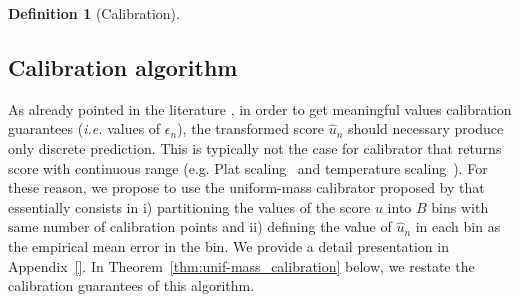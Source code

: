 \documentclass{article}
\theoremstyle{plain}
\theoremstyle{definition}
\newtheorem{definition}[theorem]{Definition}
\theoremstyle{remark}
\begin{document}
\begin{definition}[Calibration]
\end{definition}

\subsection{Calibration algorithm}
\label{sec:calib_algo}

As already pointed in the literature \cite{gupta2022distributionfreebinaryclassificationprediction}, in order to get meaningful values calibration guarantees (\textit{i.e.} values of $\epsilon_n$), the transformed score $\widehat{u}_n$ should necessary produce only discrete prediction. This is typically not the case for calibrator that returns score with continuous range (e.g. Plat scaling~\cite{plat_scaling} and temperature scaling~\cite{guo2017calibrationmodernneuralnetworks}). For these reason, we propose to use the uniform-mass calibrator proposed by \citep{gupta_distribution-free_2021} that essentially consists in i) partitioning the values of the score $u$ into $B$ bins with same number of calibration points and ii) defining the value of $\widehat{u}_n$ in each bin as the empirical mean error in the bin. We provide a detail presentation in Appendix~\ref{}. In Theorem~\ref{thm:unif-mass_calibration} below,  we restate the calibration guarantees of this algorithm.

\end{document}
